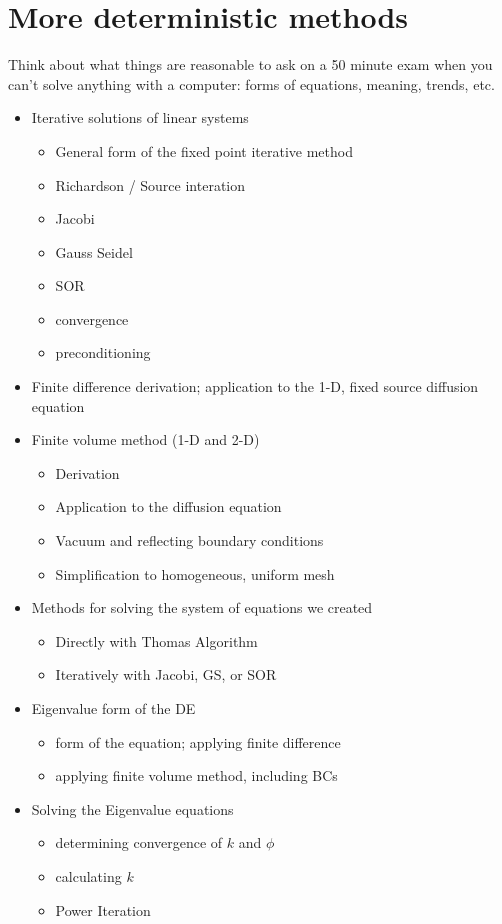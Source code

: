 \documentclass[12pt]{article}
\begin{document}
\section*{More deterministic methods}
Think about what things are reasonable to ask on a 50 minute exam when you can't solve anything with a computer: forms of equations, meaning, trends, etc.
\begin{itemize}
\item Iterative solutions of linear systems
  \begin{itemize}
  \item General form of the fixed point iterative method
  \item Richardson / Source interation
  \item Jacobi
  \item Gauss Seidel
  \item SOR
  \item convergence
  \item preconditioning
  \end{itemize}


\item Finite difference derivation; application to the 1-D, fixed source diffusion equation
\item Finite volume method (1-D and 2-D)
  \begin{itemize}
  \item Derivation
  \item Application to the diffusion equation
  \item Vacuum and reflecting boundary conditions
  \item Simplification to homogeneous, uniform mesh
  \end{itemize}
  
\item Methods for solving the system of equations we created
  \begin{itemize}
  \item Directly with Thomas Algorithm
  \item Iteratively with Jacobi, GS, or SOR
  \end{itemize}

\item Eigenvalue form of the DE
  \begin{itemize}
  \item form of the equation; applying finite difference
  \item applying finite volume method, including BCs
  \end{itemize}
  
\item Solving the Eigenvalue equations
  \begin{itemize}
  \item determining convergence of $k$ and $\phi$
  \item calculating $k$
  \item Power Iteration
  \end{itemize}
\end{itemize}
\end{document}

